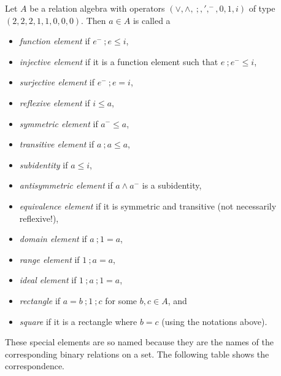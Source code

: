 \documentclass[12pt]{article}
\begin{document}
Let $A$ be a relation algebra with operators $(\vee,\wedge,\ ;,',^-,0,1,i)$ of type $(2,2,2,1,1,0,0,0)$.  Then $a\in A$ is called a
\begin{itemize}
\item \emph{function element} if $e^-\ ; e\le i$,
\item \emph{injective element} if it is a function element such that $e\ ; e^-\le i$,
\item \emph{surjective element} if $e^-\ ;e=i$,
\item \emph{reflexive element} if $i\le a$,
\item \emph{symmetric element} if $a^-\le a$, 
\item \emph{transitive element} if $a\ ; a\le a$,
\item \emph{subidentity} if $a\le i$,
\item \emph{antisymmetric element} if $a\wedge a^-$ is a subidentity,
\item \emph{equivalence element} if it is symmetric and transitive (not necessarily reflexive!),
\item \emph{domain element} if $a\ ; 1 = a$,
\item \emph{range element} if $1\ ; a=a$,
\item \emph{ideal element} if $1\ ; a\ ; 1=a$,
\item \emph{rectangle} if $a=b\ ; 1\ ; c$ for some $b,c\in A$, and
\item \emph{square} if it is a rectangle where $b=c$ (using the notations above).
\end{itemize}

These special elements are so named because they are the names of the corresponding binary relations on a set.  The following table shows the correspondence.
\end{document}
